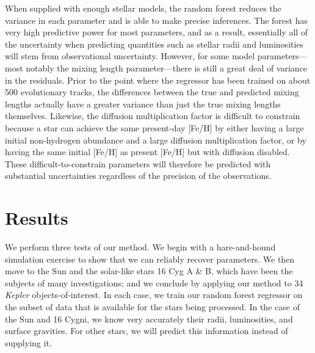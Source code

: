 \documentclass[twocolumn,twocolappendix]{aastex6}
\newif\ifref
\newcommand{\mb}[1]{\ifref\boldmath\textbf{#1}\unboldmath\else #1\fi}
\begin{document}
When supplied with enough \mb{stellar models}, the random forest reduces the variance in each parameter and is able to make precise inferences. The forest has very high predictive power for most \mb{parameters}, and as a result, essentially all of the uncertainty when predicting quantities such as stellar radii and luminosities will stem from observational uncertainty. However, for some model \mb{parameters}---most notably the mixing length parameter---there is still a great deal of variance in the residuals. Prior to \mb{the point where the regressor has been trained on} about 500 evolutionary tracks, the differences between the true and predicted mixing lengths actually have a greater variance than just the true mixing lengths themselves. Likewise, the diffusion multiplication factor is difficult to constrain because a star can achieve the same present-day [Fe/H] by either having a large initial non-hydrogen abundance and a large diffusion \mb{multiplication} factor, or by having the same initial [Fe/H] as present [Fe/H] but with diffusion disabled. These difficult-to-constrain \mb{parameters} will therefore be predicted with substantial \mb{uncertainties} regardless of the precision of the observations. 



\section{Results}
We perform three tests of our method. We begin with a hare-and-hound simulation exercise to show that we can reliably recover parameters. We then move to the Sun and the solar-like stars 16 Cyg A \& B, which have been the subjects of many investigations; and we conclude by applying our method to 34 \emph{Kepler} objects-of-interest. In each case, we train our random forest regressor on the subset of data that is available for the stars being processed. In the case of the Sun and 16 Cygni, we know very accurately their radii, luminosities, and surface gravities. For other stars, we will predict this information instead of supplying it. 
\end{document}
